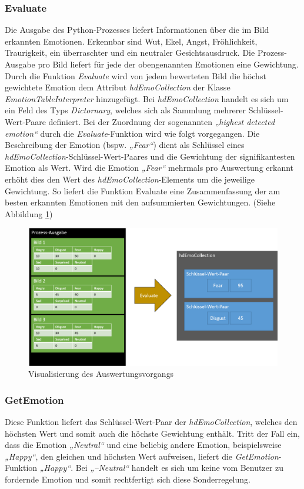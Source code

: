 \documentclass[10pt,a4paper]{report}
\begin{document}
\subsubsection{Evaluate}
Die Ausgabe des Python-Prozesses liefert Informationen über die im Bild erkannten Emotionen. Erkennbar sind Wut, Ekel, Angst, Fröhlichkeit, Traurigkeit, ein überraschter und ein neutraler Gesichtsausdruck. Die Prozess-Ausgabe pro Bild liefert für jede der obengenannten Emotionen eine Gewichtung. Durch die Funktion \textit{Evaluate} wird von jedem bewerteten Bild die höchst gewichtete Emotion dem Attribut \textit{hdEmoCollection} der Klasse \textit{EmotionTableInterpreter} hinzugefügt. Bei \textit{hdEmoCollection} handelt es sich um ein Feld des Typs \textit{Dictornary}, welches sich als Sammlung mehrerer Schlüssel-Wert-Paare definiert. Bei der Zuordnung der sogenannten „\textit{highest detected emotion“} durch die \textit{Evaluate}-Funktion wird wie folgt vorgegangen. Die Beschreibung der Emotion (bspw. \textit{„Fear“}) dient als Schlüssel eines \textit{hdEmoCollection}-Schlüssel-Wert-Paares und die Gewichtung der signifikantesten Emotion als Wert. Wird die Emotion \textit{„Fear“} mehrmals pro Auswertung erkannt erhöht dies den Wert des \textit{hdEmoCollection}-Elements um die jeweilige Gewichtung. So liefert die Funktion Evaluate eine Zusammenfassung der am besten erkannten Emotionen mit den aufsummierten Gewichtungen. (Siehe Abbildung \ref{fig:VisualisierungEvaluation})
 \begin{figure}
\includegraphics[scale=0.27]{Evaluate_Veranschaulichung.pdf}
 \caption{Visualisierung des Auswertungsvorgangs}
 \label{fig:VisualisierungEvaluation}
 \end{figure}
\subsubsection{GetEmotion}
Diese Funktion liefert das Schlüssel-Wert-Paar der \textit{hdEmoCollection}, welches den höchsten Wert und somit auch die höchste Gewichtung enthält. Tritt der Fall ein, dass die Emotion \textit{„Neutral“} und eine beliebig andere Emotion, beispielsweise \textit{„Happy“}, den gleichen und höchsten Wert aufweisen, liefert die \textit{GetEmotion}-Funktion \textit{„Happy“}. Bei \textit{„–Neutral“} handelt es sich um keine vom Benutzer zu fordernde Emotion und somit rechtfertigt sich diese Sonderregelung.
\end{document}

